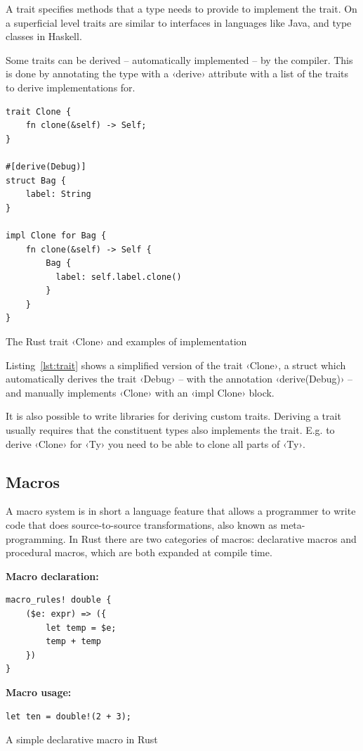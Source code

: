 A trait specifies methods that a type needs to provide to implement the trait. On a superficial level traits are similar to interfaces in languages like Java, and type classes in Haskell.

Some traits can be derived -- automatically implemented -- by the compiler. This is done by annotating the type with a ‹derive› attribute with a list of the traits to derive implementations for.

\begin{listing}[ht!]
\begin{verbatim}
trait Clone {
    fn clone(&self) -> Self;
}

#[derive(Debug)]
struct Bag {
    label: String
}

impl Clone for Bag {
    fn clone(&self) -> Self {
        Bag {
          label: self.label.clone()
        }
    }
}
\end{verbatim}
\caption{The Rust trait ‹Clone› and examples of implementation}
\label{lst:trait}
\end{listing}

Listing~\ref{lst:trait} shows a simplified version of the trait ‹Clone›, a struct which automatically derives the trait ‹Debug› -- with the annotation ‹derive(Debug)› -- and manually implements ‹Clone› with an ‹impl Clone› block.

It is also possible to write libraries for deriving custom traits. Deriving a trait usually requires that the constituent types also implements the trait. E.g. to derive ‹Clone› for ‹Ty› you need to be able to clone all parts of ‹Ty›.

\subsection{Macros}
\label{sec:macros}

A macro system is in short a language feature that allows a programmer to write code that does source-to-source transformations, also known as meta-programming. In Rust there are two categories of macros: declarative macros and procedural macros, which are both expanded at compile time.

\begin{listing}[ht!]
\textbf{Macro declaration:}
\begin{verbatim}
macro_rules! double {
    ($e: expr) => ({
        let temp = $e;
        temp + temp
    })
}
\end{verbatim}
\vspace{5mm}

\textbf{Macro usage:}
\begin{verbatim}
let ten = double!(2 + 3);
\end{verbatim}
\caption{A simple declarative macro in Rust}
\label{lst:macro-rules}
\end{listing}


